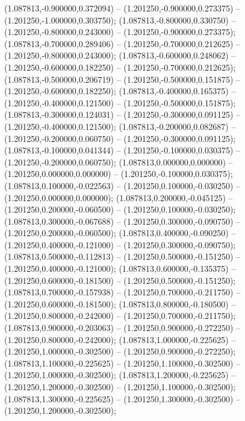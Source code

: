  (1.087813,-0.900000,0.372094) -- (1.201250,-0.900000,0.273375) -- (1.201250,-1.000000,0.303750);
 (1.087813,-0.800000,0.330750) -- (1.201250,-0.800000,0.243000) -- (1.201250,-0.900000,0.273375);
 (1.087813,-0.700000,0.289406) -- (1.201250,-0.700000,0.212625) -- (1.201250,-0.800000,0.243000);
 (1.087813,-0.600000,0.248062) -- (1.201250,-0.600000,0.182250) -- (1.201250,-0.700000,0.212625);
 (1.087813,-0.500000,0.206719) -- (1.201250,-0.500000,0.151875) -- (1.201250,-0.600000,0.182250);
 (1.087813,-0.400000,0.165375) -- (1.201250,-0.400000,0.121500) -- (1.201250,-0.500000,0.151875);
 (1.087813,-0.300000,0.124031) -- (1.201250,-0.300000,0.091125) -- (1.201250,-0.400000,0.121500);
 (1.087813,-0.200000,0.082687) -- (1.201250,-0.200000,0.060750) -- (1.201250,-0.300000,0.091125);
 (1.087813,-0.100000,0.041344) -- (1.201250,-0.100000,0.030375) -- (1.201250,-0.200000,0.060750);
 (1.087813,0.000000,0.000000) -- (1.201250,0.000000,0.000000) -- (1.201250,-0.100000,0.030375);
 (1.087813,0.100000,-0.022563) -- (1.201250,0.100000,-0.030250) -- (1.201250,0.000000,0.000000);
 (1.087813,0.200000,-0.045125) -- (1.201250,0.200000,-0.060500) -- (1.201250,0.100000,-0.030250);
 (1.087813,0.300000,-0.067688) -- (1.201250,0.300000,-0.090750) -- (1.201250,0.200000,-0.060500);
 (1.087813,0.400000,-0.090250) -- (1.201250,0.400000,-0.121000) -- (1.201250,0.300000,-0.090750);
 (1.087813,0.500000,-0.112813) -- (1.201250,0.500000,-0.151250) -- (1.201250,0.400000,-0.121000);
 (1.087813,0.600000,-0.135375) -- (1.201250,0.600000,-0.181500) -- (1.201250,0.500000,-0.151250);
 (1.087813,0.700000,-0.157938) -- (1.201250,0.700000,-0.211750) -- (1.201250,0.600000,-0.181500);
 (1.087813,0.800000,-0.180500) -- (1.201250,0.800000,-0.242000) -- (1.201250,0.700000,-0.211750);
 (1.087813,0.900000,-0.203063) -- (1.201250,0.900000,-0.272250) -- (1.201250,0.800000,-0.242000);
 (1.087813,1.000000,-0.225625) -- (1.201250,1.000000,-0.302500) -- (1.201250,0.900000,-0.272250);
 (1.087813,1.100000,-0.225625) -- (1.201250,1.100000,-0.302500) -- (1.201250,1.000000,-0.302500);
 (1.087813,1.200000,-0.225625) -- (1.201250,1.200000,-0.302500) -- (1.201250,1.100000,-0.302500);
 (1.087813,1.300000,-0.225625) -- (1.201250,1.300000,-0.302500) -- (1.201250,1.200000,-0.302500);
